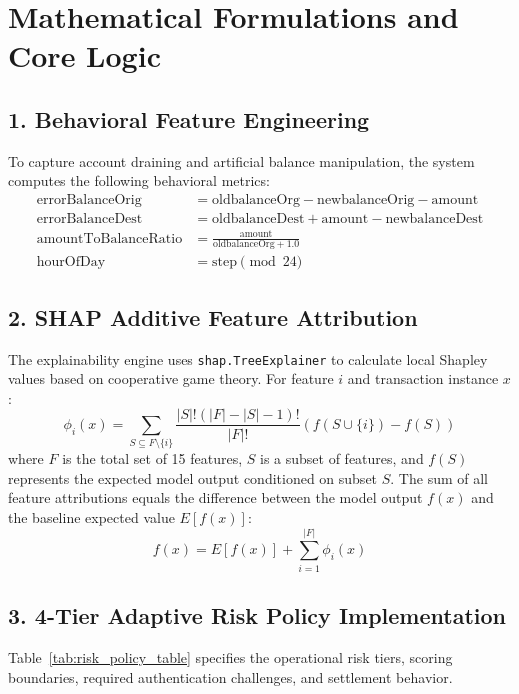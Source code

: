 \section{Mathematical Formulations and Core Logic}

\subsection{1. Behavioral Feature Engineering}
To capture account draining and artificial balance manipulation, the system computes the following behavioral metrics:
\begin{align}
    \text{errorBalanceOrig} &= \text{oldbalanceOrg} - \text{newbalanceOrig} - \text{amount} \\
    \text{errorBalanceDest} &= \text{oldbalanceDest} + \text{amount} - \text{newbalanceDest} \\
    \text{amountToBalanceRatio} &= \frac{\text{amount}}{\text{oldbalanceOrg} + 1.0} \\
    \text{hourOfDay} &= \text{step} \pmod{24}
\end{align}

\subsection{2. SHAP Additive Feature Attribution}
The explainability engine uses \texttt{shap.TreeExplainer} to calculate local Shapley values based on cooperative game theory. For feature $i$ and transaction instance $x$:
\begin{equation}
    \phi_i(x) = \sum_{S \subseteq F \setminus \{i\}} \frac{|S|!(|F| - |S| - 1)!}{|F|!} \left( f(S \cup \{i\}) - f(S) \right)
\end{equation}
where $F$ is the total set of 15 features, $S$ is a subset of features, and $f(S)$ represents the expected model output conditioned on subset $S$. The sum of all feature attributions equals the difference between the model output $f(x)$ and the baseline expected value $E[f(x)]$:
\begin{equation}
    f(x) = E[f(x)] + \sum_{i=1}^{|F|} \phi_i(x)
\end{equation}

\subsection{3. 4-Tier Adaptive Risk Policy Implementation}
Table~\ref{tab:risk_policy_table} specifies the operational risk tiers, scoring boundaries, required authentication challenges, and settlement behavior.

